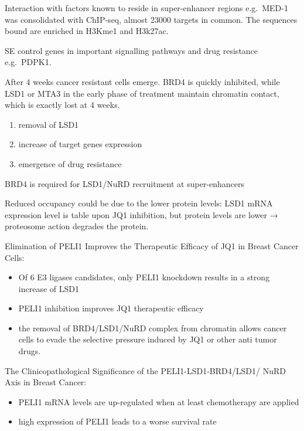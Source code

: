 Interaction with factors known to reside in super-enhancer regions
e.g.~MED-1 was consolidated with ChIP-seq, almost 23000 targets in common.
The sequences bound are enriched in H3Kme1 and H3k27ac.

SE control genes in important signalling pathways and drug resistance e.g.~PDPK1.

After 4 weeks cancer resistant cells emerge. BRD4 is quickly inhibited,
while LSD1 or MTA3 in the early phase of treatment maintain chromatin
contact, which is exactly lost at 4 weeks.

\begin{enumerate}
\tightlist
\item
  removal of LSD1
\item
  increase of target genes expression
\item
  emergence of drug resistance
\end{enumerate}

BRD4 is required for LSD1/NuRD recruitment at super-enhancers

Reduced occupancy could be due to the lower protein levels: LSD1 mRNA
expression level is table upon JQ1 inhibition, but protein levels are
lower → proteosome action degrades the protein.

Elimination of PELI1 Improves the Therapeutic Efficacy of JQ1 in Breast Cancer Cells:
\begin{itemize}
\tightlist
\item
  Of 6 E3 ligases candidates, only PELI1 knockdown results in a strong
  increase of LSD1
\item
  PELI1 inhibition improves JQ1 therapeutic efficacy
\item
  the removal of BRD4/LSD1/NuRD complex from chromatin allows cancer
  cells to evade the selective pressure induced by JQ1 or other anti
  tumor drugs.
\end{itemize}

The Clinicopathological Significance of the
PELI1-LSD1-BRD4/LSD1/ NuRD Axis in Breast
Cancer:

\begin{itemize}
\tightlist
\item
  PELI1 mRNA levels are up-regulated when at least chemotherapy are
  applied
\item
  high expression of PELI1 leads to a worse survival rate
\end{itemize}

